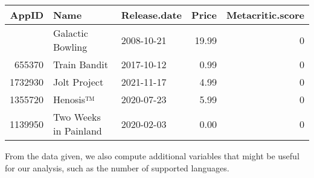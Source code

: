 \documentclass[
]{article}
\begin{document}
\begin{longtable}[]{@{}rllrr@{}}
\toprule\noalign{}
AppID & Name & Release.date & Price & Metacritic.score \\
\midrule\noalign{}
\endhead
\bottomrule\noalign{}
\endlastfoot
20200 & Galactic Bowling & 2008-10-21 & 19.99 & 0 \\
655370 & Train Bandit & 2017-10-12 & 0.99 & 0 \\
1732930 & Jolt Project & 2021-11-17 & 4.99 & 0 \\
1355720 & Henosis™ & 2020-07-23 & 5.99 & 0 \\
1139950 & Two Weeks in Painland & 2020-02-03 & 0.00 & 0 \\
\end{longtable}

From the data given, we also compute additional variables that might be
useful for our analysis, such as the number of supported languages.
\end{document}
